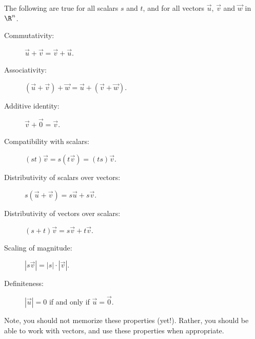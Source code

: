 \documentclass{ximera}
\begin{document}
\begin{theorem}
The following are true for all scalars $s$ and $t$, and for all
vectors $\vec u$, $\vec v$ and $\vec w$ in
$\R^n$.
\begin{description}
\item[Commutativity:] $\vec u+\vec v = \vec v+\vec u$.
\item[Associativity:] $(\vec u+\vec v)+\vec w = \vec u+(\vec v+\vec w)$.
\item[Additive identity:] $\vec v+\vec 0 = \vec v$.
\item[Compatibility with scalars:] $(st)\vec v= s(t\vec v) = (ts)\vec{v}$.
\item[Distributivity of scalars over vectors:] $s(\vec u+\vec v) = s\vec u+s\vec v$.
\item[Distributivity of vectors over scalars:] $(s+t)\vec v = s\vec v+t\vec v$.
\item[Scaling of magnitude:] $|s\vec v| = |s|\cdot|\vec v|$.
\item[Definiteness:] $|\vec{u}| = 0$ if and only if $\vec u = \vec 0$.
\end{description}
\end{theorem}
Note, you should not memorize these properties (yet!). Rather, you should be
able to work with vectors, and use these properties when appropriate.
\end{document}
